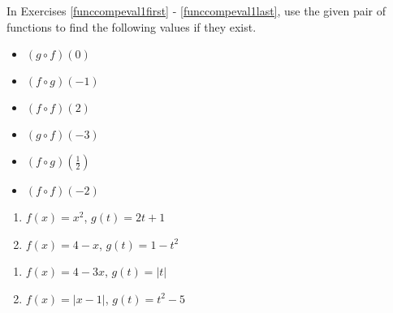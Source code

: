 \label{ExercisesforFunctionComposition}


In Exercises \ref{funccompeval1first} - \ref{funccompeval1last}, use the given pair of functions to find the following values if they exist.

\begin{multicols}{3}

\begin{itemize}

\item  $(g\circ f)(0)$

\item  $(f\circ g)(-1)$

\item  $(f \circ f)(2)$

\end{itemize}

\end{multicols}

\begin{multicols}{3}

\begin{itemize}

\item  $(g\circ f)(-3)$

\item  $(f\circ g)\left(\frac{1}{2}\right)$

\item  $(f \circ f)(-2)$

\end{itemize}

\end{multicols}

\begin{multicols}{2}
\begin{enumerate}

\item  $f(x) = x^2$, $g(t) = 2t+1$ \label{funccompeval1first}
\item  $f(x) = 4-x$, $g(t) = 1-t^2$

\setcounter{HW}{\value{enumi}}
\end{enumerate}
\end{multicols}

\begin{multicols}{2}
\begin{enumerate}
\setcounter{enumi}{\value{HW}}

\item  $f(x) = 4-3x$, $g(t) = |t|$
\item  $f(x) = |x-1|$, $g(t) = t^2-5$

\setcounter{HW}{\value{enumi}}
\end{enumerate}
\end{multicols}

